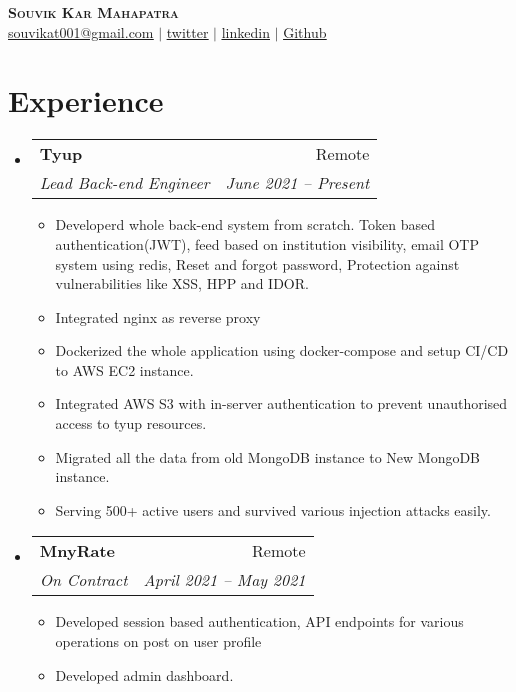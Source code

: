 \documentclass[letterpaper,11pt]{article}
\makeatletter
\newcommand{\resumeItem}[1]{
  \item\small{
    {#1 \vspace{-2pt}}
  }
}
\newcommand{\resumeSubheading}[4]{
  \vspace{-2pt}\item
    \begin{tabular*}{0.97\textwidth}[t]{l@{\extracolsep{\fill}}r}
      \textbf{#1} & #2 \\
      \textit{\small#3} & \textit{\small #4} \\
    \end{tabular*}\vspace{-7pt}
}
\newcommand{\resumeSubSubheading}[2]{
    \item
    \begin{tabular*}{0.97\textwidth}{l@{\extracolsep{\fill}}r}
      \textit{\small#1} & \textit{\small #2} \\
    \end{tabular*}\vspace{-7pt}
}
\newcommand{\resumeSubHeadingListStart}{\begin{itemize}[leftmargin=0.15in, label={}]}
\newcommand{\resumeSubHeadingListEnd}{\end{itemize}}
\newcommand{\resumeItemListStart}{\begin{itemize}}
\newcommand{\resumeItemListEnd}{\end{itemize}\vspace{-5pt}}
\makeatother
\begin{document}

\begin{center}
    \textbf{\Huge \scshape Souvik Kar Mahapatra} \\ \vspace{1pt}
    \href{mailto:souvikat001@gmail.com}{\underline{souvikat001@gmail.com}} $|$ 
    \href{https://twitter.com/souvikinator}{\underline{twitter}} $|$ 
    \href{https://linkedin.com/in/souvik-kar-mahapatra}{\underline{linkedin}} $|$
    \href{https://github.com/souvikinator}{\underline{Github}}
    
\end{center}


\section{Experience}
  \resumeSubHeadingListStart
    \resumeSubheading
      {Tyup}{Remote}
      {Lead Back-end Engineer}{June 2021 -- Present}
      \resumeItemListStart
        \resumeItem{Developerd whole back-end system from scratch. Token based authentication(JWT), feed based on institution visibility, email OTP system using redis, Reset and forgot password, Protection against vulnerabilities like XSS, HPP and IDOR.}
        \resumeItem{Integrated nginx as reverse proxy }
        \resumeItem{Dockerized the whole application using docker-compose and setup CI/CD to AWS EC2 instance.}
        \resumeItem{Integrated AWS S3 with in-server authentication to prevent unauthorised access to tyup resources.}
        \resumeItem{Migrated all the data from old MongoDB instance to New MongoDB instance.}
        \resumeItem{Serving 500+ active users and survived various injection attacks easily.}
        
    
      \resumeItemListEnd
    \resumeSubheading
      {MnyRate}{Remote}
      {On Contract}{April 2021 -- May 2021}
      \resumeItemListStart
        \resumeItem{Developed session based authentication, API endpoints for various operations on post on user profile}
        \resumeItem{Developed admin dashboard.}
     \resumeItemListEnd
  \resumeSubHeadingListEnd
\end{document}
